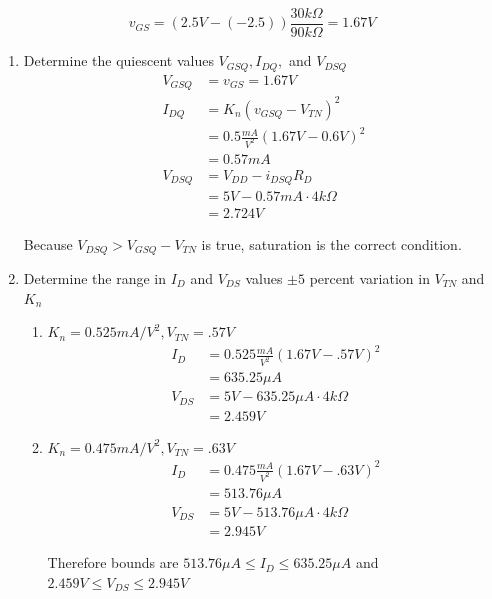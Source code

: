 \documentclass{article}
\begin{document}
\begin{enumerate}
    \begin{equation}
        v_{GS} = (2.5V -(-2.5))\frac{30k\Omega}{90k\Omega} = 1.67V
    \end{equation}
    \begin{enumerate}
        \item Determine the quiescent values $V_{GSQ}, I_{DQ},$ and $V_{DSQ}$
        \begin{align}
            V_{GSQ} &= v_{GS} = \boxed{1.67V}\\
            I_{DQ} &= K_n(v_{GSQ} - V_{TN})^2\\
            &= 0.5 \frac{mA}{V^2}(1.67V - 0.6V)^2\\
            &= \boxed{0.57mA}\\
            V_{DSQ} &= V_{DD} - i_{DSQ}R_D\\
            &= 5V - 0.57mA\cdot4k\Omega\\
            &= \boxed{2.724V}
        \end{align}
        \begin{center}
            Because $V_{DSQ} >  V_{GSQ} - V_{TN}$ is true, saturation is the correct condition. 
        \end{center}
        \item Determine the range in $I_D$ and $V_{DS}$ values $\pm5$ percent variation in $V_{TN}$ and $K_n$
        \begin{enumerate}
            \item $K_n = 0.525 mA/V^2,V_{TN} =.57V$
            \begin{align}
                I_{D} &= 0.525\frac{mA}{V^2}(1.67V - .57V)^2\\
                &= 635.25\mu A\\
                V_{DS} &= 5V - 635.25\mu A \cdot 4k\Omega\\
                &= 2.459V
            \end{align}
            \item $K_n = 0.475 mA/V^2 ,V_{TN} =.63V$
            \begin{align}
                I_{D} &= 0.475\frac{mA}{V^2}(1.67V - .63V)^2\\
                &= 513.76\mu A\\
                V_{DS} &= 5V - 513.76\mu A \cdot 4k\Omega\\
                &= 2.945V
            \end{align}
            \begin{center}
                Therefore bounds are $\boxed{513.76\mu A \leq I_D \leq 635.25\mu A}$ and $\boxed{2.459V \leq V_{DS} \leq 2.945V}$

\end{center}
\end{enumerate}
\end{enumerate}
\end{enumerate}
\end{document}
